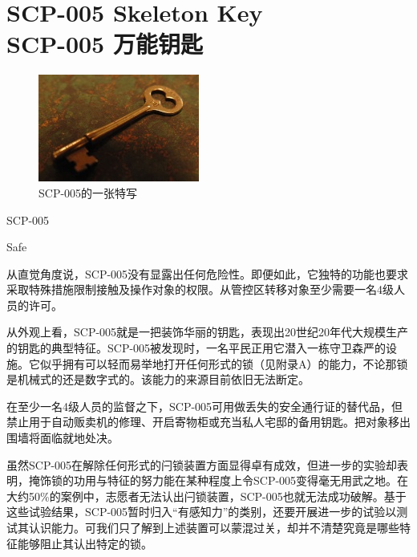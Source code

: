 \chapter[SCP-005 万能钥匙]{
	SCP-005 Skeleton Key\\
	SCP-005 万能钥匙
}

\label{chap:SCP-005}

\begin{figure}[H]
	\centering
	\includegraphics[width=0.5\linewidth]{images/SCP.005.jpg}
	\caption*{SCP-005的一张特写}
\end{figure}

SCP-005

Safe

从直觉角度说，SCP-005没有显露出任何危险性。即便如此，它独特的功能也要求采取特殊措施限制接触及操作对象的权限。从管控区转移对象至少需要一名4级人员的许可。

从外观上看，SCP-005就是一把装饰华丽的钥匙，表现出20世纪20年代大规模生产的钥匙的典型特征。SCP-005被发现时，一名平民正用它潜入一栋守卫森严的设施。它似乎拥有可以轻而易举地打开任何形式的锁（见附录A）的能力，不论那锁是机械式的还是数字式的。该能力的来源目前依旧无法断定。

在至少一名4级人员的监督之下，SCP-005可用做丢失的安全通行证的替代品，但禁止用于自动贩卖机的修理、开启寄物柜或充当私人宅邸的备用钥匙。把对象移出围墙将面临就地处决。

虽然SCP-005在解除任何形式的闩锁装置方面显得卓有成效，但进一步的实验却表明，掩饰锁的功用与特征的努力能在某种程度上令SCP-005变得毫无用武之地。在大约50\%的案例中，志愿者无法认出闩锁装置，SCP-005也就无法成功破解。基于这些试验结果，SCP-005暂时归入“有感知力”的类别，还要开展进一步的试验以测试其认识能力。可我们只了解到上述装置可以蒙混过关，却并不清楚究竟是哪些特征能够阻止其认出特定的锁。
